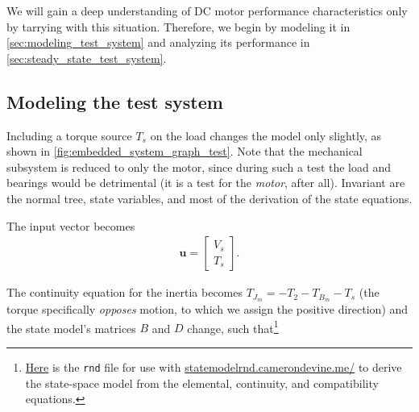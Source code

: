 \documentclass[dynamic_systems.tex]{subfiles}
\begin{document}
We will gain a deep understanding of DC motor performance characteristics only by tarrying with this situation.
Therefore, we begin by modeling it in \autoref{sec:modeling_test_system} and analyzing its performance in \autoref{sec:steady_state_test_system}.
\tags{}

\subsection{Modeling the test system}
\tags{}
\label{sec:modeling_test_system}

Including a torque source $T_s$ on the load changes the model only slightly, as shown in \autoref{fig:embedded_system_graph_test}.
Note that the mechanical subsystem is reduced to only the motor, since during such a test the load and bearings would be detrimental (it is a test for the \emph{motor}, after all).
Invariant are the normal tree, state variables, and most of the derivation of the state equations.

The input vector becomes
\begin{align}
	\bm{u} = \begin{bmatrix} V_s \\ T_s \end{bmatrix}.
\end{align}

The continuity equation for the inertia becomes $T_{J_m} = -T_2 - T_{B_m} - T_s$ (the torque specifically \emph{opposes} motion, to which we assign the positive direction) and the state model's matrices $B$ and $D$ change, such that\footnote{
\href{http://ricopic.one/dynamic_systems/source/motor_model_characteristics.rnd}{Here} 
is the \texttt{rnd} file for use with \href{http://statemodelrnd.camerondevine.me/}{statemodelrnd.camerondevine.me/} to derive the state-space model from the elemental, continuity, and compatibility equations.}
\end{document}
